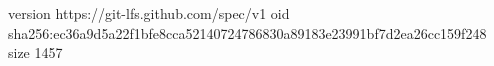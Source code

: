 version https://git-lfs.github.com/spec/v1
oid sha256:ec36a9d5a22f1bfe8cca52140724786830a89183e23991bf7d2ea26cc159f248
size 1457
